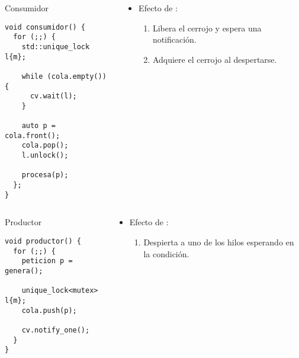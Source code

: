 \begin{frame}[t,fragile]
\begin{columns}

\begin{column}{.5\textwidth}
\begin{block}{Consumidor}
\begin{lstlisting}
void consumidor() {
  for (;;) {
    std::unique_lock l{m};

    while (cola.empty()) {
      cv.wait(l);
    }

    auto p = cola.front();
    cola.pop();
    l.unlock();
   
    procesa(p);
  };
}
\end{lstlisting}
\end{block}
\end{column}

\begin{column}{.5\textwidth}
\begin{itemize}
  \item Efecto de :
    \begin{enumerate}
      \item Libera el cerrojo y espera una notificación.
      \item Adquiere el cerrojo al despertarse.
    \end{enumerate}
\end{itemize}
\end{column}

\end{columns}
\end{frame}

\begin{frame}[t,fragile]
\begin{columns}
\begin{column}{.5\textwidth}
\begin{block}{Productor}
\begin{lstlisting}
void productor() {
  for (;;) {
    peticion p = genera();

    unique_lock<mutex> l{m};
    cola.push(p);

    cv.notify_one();
  }
}
\end{lstlisting}
\end{block}
\end{column}

\begin{column}{.5\textwidth}
\begin{itemize}
\item Efecto de :
  \begin{enumerate}
    \item Despierta a uno de los hilos esperando en la condición.
  \end{enumerate}
\end{itemize}
\end{column}

\end{columns}
\end{frame}

